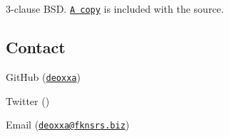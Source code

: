 3-\/clause B\+SD. \href{./LICENSE}{\tt A copy} is included with the source.

\subsection*{Contact}


\begin{DoxyItemize}
\item Git\+Hub (\href{http://github.com/deoxxa}{\tt deoxxa})
\item Twitter (\href{http://twitter.com/deoxxa}{\tt })
\item Email (\href{mailto:deoxxa@fknsrs.biz}{\tt deoxxa@fknsrs.\+biz}) 
\end{DoxyItemize}